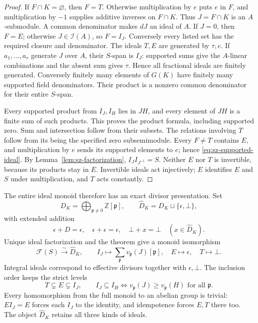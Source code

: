 \begin{proof}
If \(F\cap K=\varnothing\), then \(F=T\). Otherwise multiplication
by \(e\) puts \(e\) in \(F\), and multiplication by \(-1\) supplies
additive inverses on \(F\cap K\). Thus \(J=F\cap K\) is an \(A\)-submodule.
A common denominator makes \(dJ\) an ideal of \(A\). If \(J=0\),
then \(F=E\); otherwise \(J\in\mathcal I(A)\), so \(F=I_J\).
Conversely every listed set has the required closure and denominator.
The ideals \(T,E\) are generated by \(\tau,e\). If \(a_1,\ldots,a_r\)
generate \(J\) over \(A\), their \(S\)-span is \(I_J\):
supported sums give the \(A\)-linear combinations and the absent
sum gives \(\tau\). Hence all fractional ideals are finitely generated.
Conversely finitely many elements of \(G(K)\) have finitely many
supported field denominators. Their product is a nonzero common
denominator for their entire \(S\)-span.

Every supported product from \(I_J,I_H\) lies in \(JH\), and every
element of \(JH\) is a finite sum of such products. This proves the
product formula, including supported zero. Sum and intersection
follow from their subsets. The relations involving \(T\) follow
from its being the specified zero subsemimodule. Every \(F\ne T\)
contains \(E\), and multiplication by \(e\) sends its supported
elements to \(e\); hence \eqref{eq:sz-supported-ideal}.
By Lemma~\ref{lem:sz-factorization}, \(I_JI_{J^{-1}}=S\).
Neither \(E\) nor \(T\) is invertible, because its products stay in
\(E\). Invertible ideals act injectively; \(E\) identifies \(E\)
and \(S\) under multiplication, and \(T\) acts constantly.
\end{proof}

The entire ideal monoid therefore has an exact divisor presentation.
Set
\[
 D_K=\bigoplus_{\mathfrak p\ne0}\mathbb Z[\mathfrak p],
 \qquad \widehat D_K=D_K\sqcup\{\epsilon,\bot\},
\]
with extended addition
\[
 \epsilon+D=\epsilon,\quad \epsilon+\epsilon=\epsilon,\quad
 \bot+x=\bot\quad(x\in\widehat D_K).
\]
Unique ideal factorization and the theorem give a monoid isomorphism
\begin{equation}\label{eq:sz-full-divisor-monoid}
 \mathcal F(S)\xrightarrow{\sim}\widehat D_K,\qquad
 I_J\mapsto\sum_{\mathfrak p}v_{\mathfrak p}(J)[\mathfrak p],
 \quad E\mapsto\epsilon,\quad T\mapsto\bot .
\end{equation}
Integral ideals correspond to effective divisors together with
\(\epsilon,\bot\). The inclusion order keeps the strict levels
\[
 T\subsetneq E\subsetneq I_J,\qquad
 I_J\subseteq I_H\iff v_{\mathfrak p}(J)\ge v_{\mathfrak p}(H)
 \text{ for all }\mathfrak p.
\]
Every homomorphism from the full monoid to an abelian group is
trivial: \(EI_J=E\) forces each \(I_J\) to the identity, and
idempotence forces \(E,T\) there too. The object
\(\widehat D_K\) retains all three kinds of ideals.

